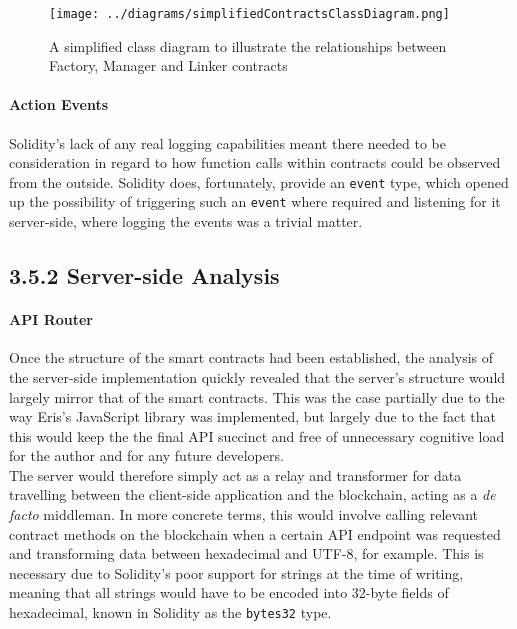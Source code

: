 \begin{figure}[htbp]
\centering
\texttt{[image: ../diagrams/simplifiedContractsClassDiagram.png]}
\caption{A simplified class diagram to illustrate the relationships
between Factory, Manager and Linker contracts}
\end{figure}

\paragraph{Action Events}\label{action-events}

Solidity's lack of any real logging capabilities meant there needed to
be consideration in regard to how function calls within contracts could
be observed from the outside. Solidity does, fortunately, provide an
\texttt{event} type, which opened up the possibility of triggering such
an \texttt{event} where required and listening for it server-side, where
logging the events was a trivial matter.

\subsection{3.5.2 Server-side Analysis}\label{server-side-analysis}

\paragraph{API Router}\label{api-router}

Once the structure of the smart contracts had been established, the
analysis of the server-side implementation quickly revealed that the
server's structure would largely mirror that of the smart contracts.
This was the case partially due to the way Eris's JavaScript library was
implemented, but largely due to the fact that this would keep the the
final API succinct and free of unnecessary cognitive load for the author
and for any future developers.\\
The server would therefore simply act as a relay and transformer for
data travelling between the client-side application and the blockchain,
acting as a \emph{de facto} middleman. In more concrete terms, this
would involve calling relevant contract methods on the blockchain when a
certain API endpoint was requested and transforming data between
hexadecimal and UTF-8, for example. This is necessary due to Solidity's
poor support for strings at the time of writing, meaning that all
strings would have to be encoded into 32-byte fields of hexadecimal,
known in Solidity as the \texttt{bytes32} type.

